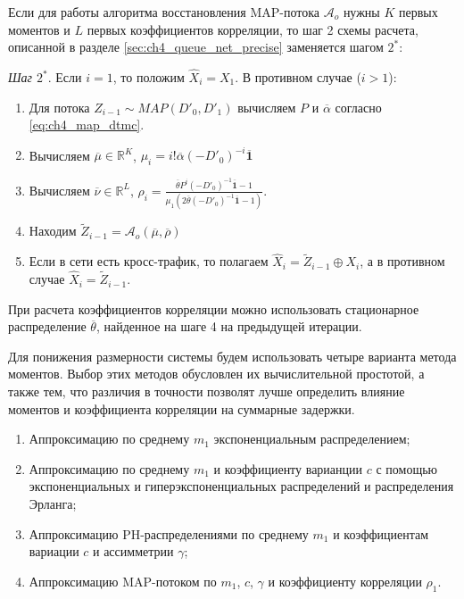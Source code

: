 Если для работы алгоритма восстановления MAP-потока $\mathcal{A}_o$ нужны $K$ первых моментов и $L$ первых коэффициентов корреляции, то шаг 2 схемы расчета, описанной в разделе \ref{sec:ch4_queue_net_precise} заменяется шагом $2^*$:

\textit{Шаг $2^*$}. Если $i = 1$, то положим $\hat{X}_i = X_1$. В противном случае ($i > 1$):
\begin{enumerate}
\item Для потока $Z_{i-1} \sim MAP(D'_0, D'_1)$ вычисляем $P$ и $\overline\alpha$ согласно \eqref{eq:ch4_map_dtmc}.
\item Вычисляем $\overline\mu \in \mathbb{R}^{K}$, $\mu_i = i! \overline\alpha (-D'_0)^{-i} \overline{\mathbf{1}}$
\item Вычисляем $\overline\nu \in \mathbb{R}^{L}$, $\rho_i = \frac{\overline\theta P^i (-D'_0)^{-1} \overline{\mathbf{1}} - 1}{\mu_1 \left( 2 \overline\theta (-D'_0)^{-1} \overline{\mathbf{1}} - 1 \right)}$.
\item Находим $\tilde{Z}_{i-1} = \mathcal{A}_o(\overline\mu, \overline\rho)$
\item Если в сети есть кросс-трафик, то полагаем $\hat{X}_i = \tilde{Z}_{i-1} \oplus X_i$, а в противном случае $\hat{X}_i = \tilde{Z}_{i-1}$.
\end{enumerate}
При расчета коэффициентов корреляции можно использовать стационарное распределение $\overline\theta$, найденное на шаге 4 на предыдущей итерации.

Для понижения размерности системы будем использовать четыре варианта метода моментов. Выбор этих методов обусловлен их вычислительной простотой, а также тем, что различия в точности позволят лучше определить влияние моментов и коэффициента корреляции на суммарные задержки.

\begin{enumerate}
\item Аппроксимацию по среднему $m_1$ экспоненциальным распределением;
\item Аппроксимацию по среднему $m_1$ и коэффициенту варианции $c$ с помощью экспоненциальных и гиперэкспоненциальных распределений и распределения Эрланга;
\item Аппроксимацию PH-распределениями по среднему $m_1$ и коэффициентам вариации $c$ и ассимметрии $\gamma$;
\item Аппроксимацию MAP-потоком по $m_1$, $c$, $\gamma$ и коэффициенту корреляции $\rho_1$.
\end{enumerate}

